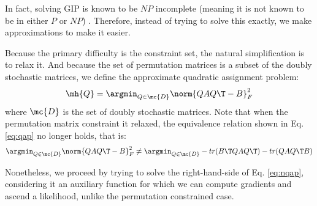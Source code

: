 In fact, solving GIP is known to be $NP$ incomplete (meaning it is not known to be in either $P$ or $NP$) \cite{??}.  Therefore, instead of trying to solve this exactly, we make approximations to make it easier.  


Because the primary difficulty is the constraint set, the natural simplification is to relax it.  And because the set of permutation matrices is a subset of the doubly stochastic matrices, we define the approximate quadratic assignment problem:
\begin{align} \label{eq:tqap}
	\mh{Q} = \argmin_{Q \in \mc{D}} \norm{Q A Q\T - B}^2_F
\end{align}
where $\mc{D}$ is the set of doubly stochastic matrices.  Note that when the permutation matrix constraint it relaxed, the equivalence relation shown in Eq. \eqref{eq:qap} no longer holds, that is:
\begin{align} \label{eq:nqap}
	\argmin_{Q \in \mc{D}} \norm{Q A Q\T - B}^2_F \neq \argmin_{Q \in \mc{D}} - tr(B\T QAQ\T) - tr(QAQ\T B)
\end{align}

Nonetheless, we proceed by trying to solve the right-hand-side of Eq. \eqref{eq:nqap}, considering it an auxiliary function for which we can compute gradients and ascend a likelihood, unlike the permutation constrained case.  

